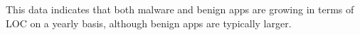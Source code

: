 \documentclass{sig-alternate}
\newcommand{\todo}[1]{\textcolor{cyan}{\textbf{[#1]}}}
\begin{document}
%
%
%
%
%
%
%
%
%
%
%
%


This data indicates that both malware and benign apps are growing in terms of LOC on a yearly basis, although benign apps are typically larger. %





\end{document}
